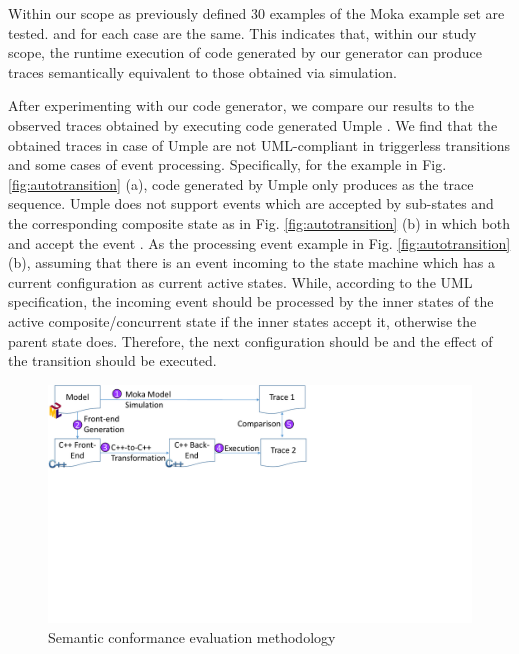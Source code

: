 Within our scope as previously defined 30 examples of the Moka example set are tested.  and  for each case are the same. 
This indicates that, within our study scope, the runtime execution of code generated by our generator can produce traces semantically equivalent to those obtained via simulation. 


After experimenting with our code generator, we compare our results to the observed traces obtained by executing code generated 
Umple \cite{Badreddin2014}. 
We find that the obtained traces in case of 
Umple are not UML-compliant in triggerless transitions and some cases of event processing.
Specifically, for the example in Fig. \ref{fig:autotransition} (a), 
code generated by Umple only produces  as the trace sequence. 
Umple does not support events which are accepted by sub-states and the corresponding composite state as in Fig. \ref{fig:autotransition} (b) in which both  and  accept the event .
As the processing event example in Fig. \ref{fig:autotransition} (b), assuming that there is an event  incoming to the state machine which has a current configuration  as current active states. While, according to the UML specification, the incoming event should be processed by the inner states of the active composite/concurrent state if the inner states accept it, otherwise the parent state does. Therefore, the next configuration should be  and the  effect of the transition  should be executed. %


\begin{figure}
\centering
\includegraphics[clip, trim=0.2cm 8.6cm 19.4cm 6.9cm, width=0.8\columnwidth]{figures/semanticconformance.pdf}
\caption{Semantic conformance evaluation methodology} 
\label{fig:semanticconformance}
\end{figure}

